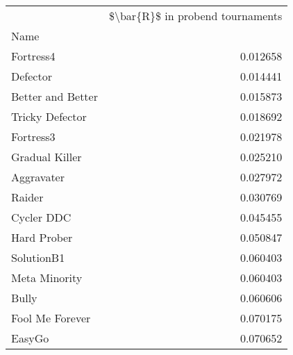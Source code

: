 \begin{tabular}{lr}
\toprule
{} &  \$\textbackslash bar\{R\}\$ in probend tournaments \\
Name              &                                   \\
\midrule
Fortress4         &                          0.012658 \\
Defector          &                          0.014441 \\
Better and Better &                          0.015873 \\
Tricky Defector   &                          0.018692 \\
Fortress3         &                          0.021978 \\
Gradual Killer    &                          0.025210 \\
Aggravater        &                          0.027972 \\
Raider            &                          0.030769 \\
Cycler DDC        &                          0.045455 \\
Hard Prober       &                          0.050847 \\
SolutionB1        &                          0.060403 \\
Meta Minority     &                          0.060403 \\
Bully             &                          0.060606 \\
Fool Me Forever   &                          0.070175 \\
EasyGo            &                          0.070652 \\
\bottomrule
\end{tabular}
